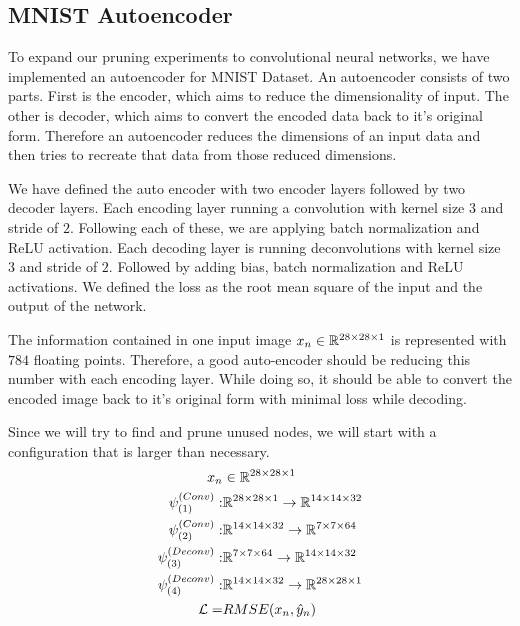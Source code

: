 \subsection{MNIST Autoencoder}
To expand our pruning experiments to convolutional neural networks, we have implemented an autoencoder for MNIST Dataset. An autoencoder consists of two parts. First is the encoder, which aims to reduce the dimensionality of input. The other is decoder, which aims to convert the encoded data back to it's original form. Therefore an autoencoder reduces the dimensions of an input data and then tries to recreate that data from those reduced dimensions.

We have defined the auto encoder with two encoder layers followed by two decoder layers. Each encoding layer running a convolution with kernel size $3$ and stride of $2$. Following each of these, we are applying batch normalization and ReLU activation. Each decoding layer is running deconvolutions with kernel size $3$ and stride of $2$. Followed by adding bias, batch normalization and ReLU activations. We defined the loss as the root mean square of the input and the output of the network. 

The information contained in one input image $x_{n} \in \mathbb{R}^{28 \times 28 \times 1}$ is represented with $784$ floating points. Therefore, a good auto-encoder should be reducing this number with each encoding layer. While doing so, it should be able to convert the encoded image back to it's original form with minimal loss while decoding. 

Since we will try to find and prune unused nodes, we will start with a configuration that is larger than necessary. 
\begin{equation*}
\begin{split}
x_{n} &\in \mathbb{R}^{28 \times 28 \times 1}\\
\psi^{(Conv)}_{(1)}:& \mathbb{R}^{28 \times 28 \times 1} \rightarrow \mathbb{R}^{14 \times 14 \times 32} \\
\psi^{(Conv)}_{(2)}:& \mathbb{R}^{14 \times 14 \times 32} \rightarrow \mathbb{R}^{7 \times 7 \times 64} \\
\psi^{(Deconv)}_{(3)}:& \mathbb{R}^{7 \times 7 \times 64} \rightarrow \mathbb{R}^{14 \times 14 \times 32} \\
\psi^{(Deconv)}_{(4)}:& \mathbb{R}^{14 \times 14 \times 32} \rightarrow \mathbb{R}^{28 \times 28 \times 1} \\
\mathcal{L} =& RMSE(x_{n}, \hat{y}_{n})
\end{split}
\end{equation*}

